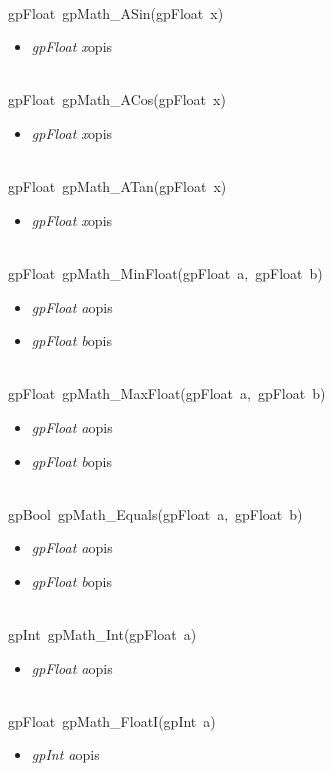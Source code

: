  \ \\
\mbox{\textsf{gpFloat gpMath_ASin(gpFloat x)}}
	\begin{itemize}
		\item \textit{gpFloat x}\quad opis
	\end{itemize}

 \ \\
\mbox{\textsf{gpFloat gpMath_ACos(gpFloat x)}}
	\begin{itemize}
		\item \textit{gpFloat x}\quad opis
	\end{itemize}

 \ \\
\mbox{\textsf{gpFloat gpMath_ATan(gpFloat x)}}
	\begin{itemize}
		\item \textit{gpFloat x}\quad opis
	\end{itemize}

 \ \\
\mbox{\textsf{gpFloat gpMath_MinFloat(gpFloat a, gpFloat b)}}
	\begin{itemize}
		\item \textit{gpFloat a}\quad opis
		\item \textit{gpFloat b}\quad opis
	\end{itemize}

 \ \\
\mbox{\textsf{gpFloat gpMath_MaxFloat(gpFloat a, gpFloat b)}}
	\begin{itemize}
		\item \textit{gpFloat a}\quad opis
		\item \textit{gpFloat b}\quad opis
	\end{itemize}

 \ \\
\mbox{\textsf{gpBool gpMath_Equals(gpFloat a, gpFloat b)}}
	\begin{itemize}
		\item \textit{gpFloat a}\quad opis
		\item \textit{gpFloat b}\quad opis
	\end{itemize}

 \ \\
\mbox{\textsf{gpInt gpMath_Int(gpFloat a)}}
	\begin{itemize}
		\item \textit{gpFloat a}\quad opis
	\end{itemize}

 \ \\
\mbox{\textsf{gpFloat gpMath_FloatI(gpInt a)}}
	\begin{itemize}
		\item \textit{gpInt a}\quad opis
	\end{itemize}

